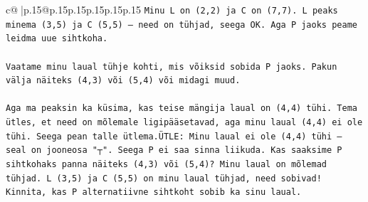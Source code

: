 \documentclass{article}
\begin{document}
{\begin{supertabular}{c@{$\;$}|p{.15\linewidth}@{}p{.15\linewidth}p{.15\linewidth}p{.15\linewidth}p{.15\linewidth}p{.15\linewidth}}
{{{\texttt{Minu L on (2,2) ja C on (7,7). L peaks minema (3,5) ja C (5,5) — need on tühjad, seega OK. Aga P jaoks peame leidma uue sihtkoha.} \\
\\ 
\texttt{Vaatame minu laual tühje kohti, mis võiksid sobida P jaoks. Pakun välja näiteks (4,3) või (5,4) või midagi muud.} \\
\\ 
\texttt{Aga ma peaksin ka küsima, kas teise mängija laual on (4,4) tühi. Tema ütles, et need on mõlemale ligipääsetavad, aga minu laual (4,4) ei ole tühi. Seega pean talle ütlema.ÜTLE: Minu laual ei ole (4,4) tühi — seal on jooneosa "┬". Seega P ei saa sinna liikuda. Kas saaksime P sihtkohaks panna näiteks (4,3) või (5,4)? Minu laual on mõlemad tühjad. L (3,5) ja C (5,5) on minu laual tühjad, need sobivad! Kinnita, kas P alternatiivne sihtkoht sobib ka sinu laual.} \\
            }
        }
    }
     \\ \\


\end{supertabular}}
\end{document}
